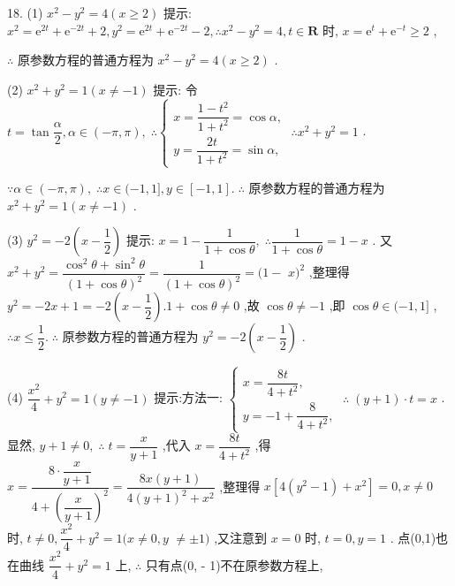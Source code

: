 18. (1) ${x}^{2} - {y}^{2} = 4\left( {x \geq  2}\right)$ 提示: ${x}^{2} = {\mathrm{e}}^{2t} + {\mathrm{e}}^{-{2t}} + 2,{y}^{2} = {\mathrm{e}}^{2t} + {\mathrm{e}}^{-{2t}} - 2,\therefore {x}^{2} - {y}^{2} = 4,t \in  \mathbf{R}$ 时, $x = {\mathrm{e}}^{t} + {\mathrm{e}}^{-t} \geq  2$ ,

$\therefore$ 原参数方程的普通方程为 ${x}^{2} - {y}^{2} = 4\left( {x \geq  2}\right)$ .

(2) ${x}^{2} + {y}^{2} = 1\left( {x \neq   - 1}\right)$ 提示: 令 $t = \tan \dfrac{\alpha }{2},\alpha  \in  \left( {-\pi ,\pi }\right) ,\;\therefore \left\{  {\begin{array}{l} x = \dfrac{1 - {t}^{2}}{1 + {t}^{2}} = \cos \alpha , \\  y = \dfrac{2t}{1 + {t}^{2}} = \sin \alpha , \end{array}\;\therefore {x}^{2} + {y}^{2} = 1}\right.$ .

$\because \alpha  \in  \left( {-\pi ,\pi }\right) ,\;\therefore x \in  ( - 1,1\rbrack ,y \in  \left\lbrack  {-1,1}\right\rbrack  .\;\therefore$ 原参数方程的普通方程为 ${x}^{2} + {y}^{2} = 1\left( {x \neq   - 1}\right)$ .

(3) ${y}^{2} =  - 2\left( {x - \dfrac{1}{2}}\right)$ 提示: $x = 1 - \dfrac{1}{1 + \cos \theta },\;\therefore \dfrac{1}{1 + \cos \theta } = 1 - x$ . 又 ${x}^{2} + {y}^{2} = \dfrac{{\cos }^{2}\theta  + {\sin }^{2}\theta }{{\left( 1 + \cos \theta \right) }^{2}} = \dfrac{1}{{\left( 1 + \cos \theta \right) }^{2}} = (1 -$  $x{)}^{2}$ ,整理得 ${y}^{2} =  - {2x} + 1 =  - 2\left( {x - \dfrac{1}{2}}\right) {.1} + \cos \theta  \neq  0$ ,故 $\cos \theta  \neq   - 1$ ,即 $\cos \theta  \in  ( - 1,1\rbrack$ , $\therefore x \leq  \dfrac{1}{2}.\;\therefore$ 原参数方程的普通方程为 ${y}^{2} =  - 2\left( {x - \dfrac{1}{2}}\right)$ .

(4) $\dfrac{{x}^{2}}{4} + {y}^{2} = 1\left( {y \neq   - 1}\right)$ 提示:方法一: $\left\{  {\begin{array}{l} x = \dfrac{8t}{4 + {t}^{2}}, \\  y =  - 1 + \dfrac{8}{4 + {t}^{2}}, \end{array}\;\therefore \;\left( {y + 1}\right)  \cdot  t = x}\right.$ . 显然, $y + 1 \neq  0,\;\therefore \;t = \dfrac{x}{y + 1}$ ,代入 $x = \dfrac{8t}{4 + {t}^{2}}$ ,得 $x = \dfrac{8 \cdot  \dfrac{x}{y + 1}}{4 + {\left( \dfrac{x}{y + 1}\right) }^{2}} = \dfrac{{8x}\left( {y + 1}\right) }{4{\left( y + 1\right) }^{2} + {x}^{2}}$ ,整理得 $x\left\lbrack  {4\left( {{y}^{2} - 1}\right)  + {x}^{2}}\right\rbrack   = 0,x \neq  0$ 时, $t \neq  0,\dfrac{{x}^{2}}{4} + {y}^{2} = 1(x \neq  0,y$  $\neq   \pm  1)$ ,又注意到 $x = 0$ 时, $t = 0,y = 1$ . 点(0,1)也在曲线 $\dfrac{{x}^{2}}{4} + {y}^{2} = 1$ 上, $\therefore$ 只有点(0, - 1)不在原参数方程上,


